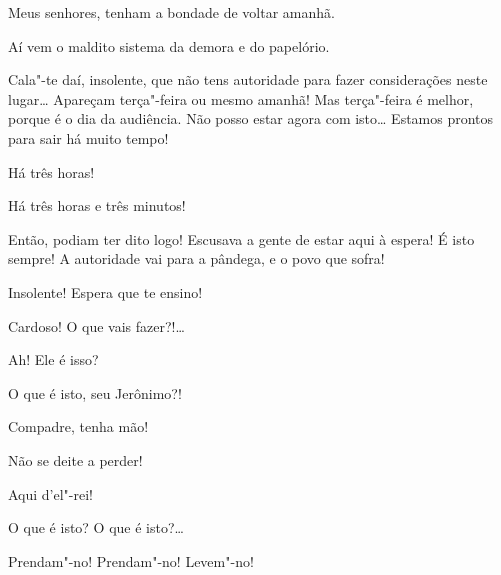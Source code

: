 \begin{linenumbers}
 Meus senhores, tenham a bondade de voltar amanhã.

 Aí vem o maldito sistema da demora e do papelório.

 Cala"-te daí, insolente, que não tens autoridade para fazer
considerações neste lugar\ldots{} Apareçam
terça"-feira ou mesmo amanhã! Mas terça"-feira é melhor, porque é o dia da
audiência. Não posso estar agora
com isto\ldots{} Estamos prontos para sair há muito tempo!

 Há três horas!

  Há três horas e três
minutos!

  Então, podiam ter dito logo!
Escusava a gente de estar aqui à espera! É isto
sempre! A autoridade vai para a pândega, e o povo que sofra!

 Insolente! Espera que te ensino! 

 Cardoso! O que vais fazer?!\ldots{}

 Ah! Ele é isso? 

 O que é isto, seu Jerônimo?!

 Compadre, tenha mão!

 Não se deite a perder!

  Aqui d’el"-rei!




 O que é isto? O que é isto?\ldots{} 

 Prendam"-no! Prendam"-no! 
Levem"-no!  





\end{linenumbers}
